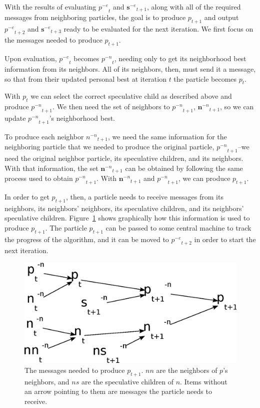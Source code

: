 \documentclass[conference,letterpaper]{IEEEtran}
\newcommand{\fig}[1]{Figure~\ref{fig:#1}}
\providecommand{\noeval}[1]{\ensuremath{#1^{-e}}}
\providecommand{\nonbest}[1]{\ensuremath{#1^{-n}}}
\providecommand{\p}{\ensuremath{p}}
\providecommand{\sset}{\ensuremath{\mathbf{s}}}
\providecommand{\n}{\ensuremath{n}}
\providecommand{\nset}{\ensuremath{\mathbf{n}}}
\begin{document}
With the results of evaluating $\noeval{\p}_t$ and $\noeval{\sset}_{t+1}$,
along with all of the required messages from neighboring particles, the goal is
to produce $\p_{t+1}$ and output $\noeval{\p}_{t+2}$ and $\noeval{\sset}_{t+3}$
ready to be evaluated for the next iteration.  We first focus on the messages
needed to produce $\p_{t+1}$.

Upon evaluation, $\noeval{\p}_t$ becomes $\nonbest{\p}_t$, needing only to get
its neighborhood best information from its neighbors.  All of its neighbors,
then, must send it a message, so that from their updated personal best at
iteration $t$ the particle becomes $\p_t$.

With $\p_t$ we can select the correct speculative child as described above and
produce $\nonbest{\p}_{t+1}$.  We then need the set of neighbors to
$\nonbest{\p}_{t+1}$, $\nonbest{\nset}_{t+1}$, so we can update
$\nonbest{\p}_{t+1}$'s neighborhood best.

To produce each neighbor $\nonbest{\n}_{t+1}$, we need the same information for
the neighboring particle that we needed to produce the original particle,
$\nonbest{\p}_{t+1}$--we need the original neighbor particle, its speculative
children, and its neighbors.  With that information, the set
$\nonbest{\nset}_{t+1}$ can be obtained by following the same process used to
obtain $\nonbest{\p}_{t+1}$.  With $\nonbest{\nset}_{t+1}$ and
$\nonbest{\p}_{t+1}$, we can produce $\p_{t+1}$.

In order to get $\p_{t+1}$, then, a particle needs to receive messages from its
neighbors, its neighbors' neighbors, its speculative children, and its
neighbors' speculative children.  \fig{origparticle} shows graphically how this
information is used to produce $\p_{t+1}$.  The particle $\p_{t+1}$ can be
passed to some central machine to track the progress of the algorithm, and it
can be moved to $\noeval{\p}_{t+2}$ in order to start the next iteration.

\begin{figure}
  \centering
  \includegraphics[width=\columnwidth]{messages.eps}
  \caption{The messages needed to produce $\p_{t+1}$. $nn$ are the neighbors
  of $p$'s neighbors, and $ns$ are the speculative children of $n$.  Items
  without an arrow pointing to them are messages the particle needs to receive.}
  \label{fig:origparticle}
\end{figure}
\end{document}
